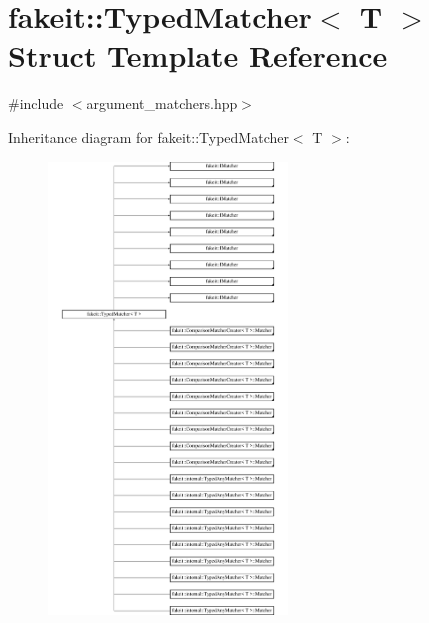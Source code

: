 \hypertarget{structfakeit_1_1TypedMatcher}{}\section{fakeit\+::Typed\+Matcher$<$ T $>$ Struct Template Reference}
\label{structfakeit_1_1TypedMatcher}


{\ttfamily \#include $<$argument\+\_\+matchers.\+hpp$>$}

Inheritance diagram for fakeit\+::Typed\+Matcher$<$ T $>$\+:\begin{figure}[H]
\begin{center}
\leavevmode
\includegraphics[height=12.000000cm]{structfakeit_1_1TypedMatcher}
\end{center}
\end{figure}

